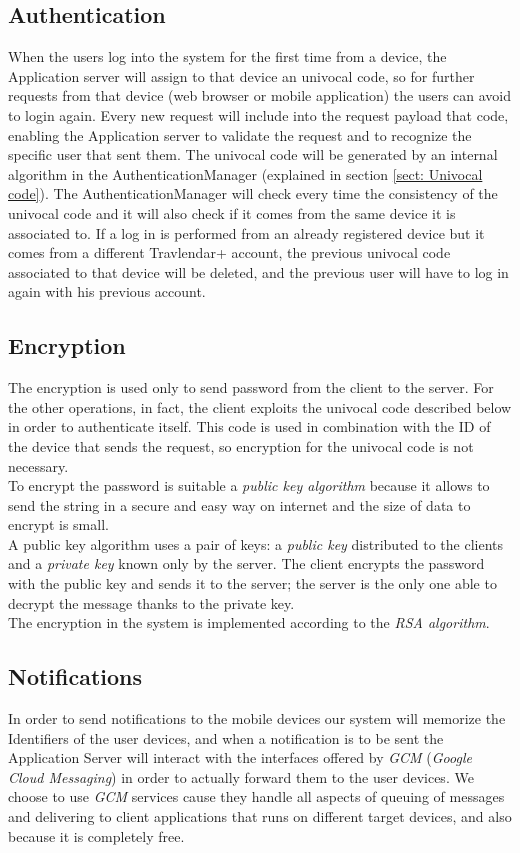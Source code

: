 \subsection{Authentication}
\label{subsect:Authentication}
When the users log into the system for the first time from a device, the Application server will assign to that device an univocal code, so for further requests from that device (web browser or mobile application) the users can avoid to login again. Every new request will include into the request payload that code, enabling the Application server to validate the request and to recognize the specific user that sent them. The univocal code will be generated by an internal algorithm in the AuthenticationManager (explained in section \ref{sect: Univocal code}). The AuthenticationManager will check every time the consistency of the univocal code and it will also check if it comes from the same device it is associated to.
If a log in is performed from an already registered device but it comes from a different Travlendar+ account, the previous univocal code associated to that device will be deleted, and the previous user will have to log in again with his previous account.

\subsection{Encryption}
\label{subsect:Encryption}
The encryption is used only to send password from the client to the server. For the other operations, in fact, the client exploits the univocal code described below in order to authenticate itself. This code is used in combination with the ID of the device that sends the request, so encryption for the univocal code is not necessary.\\
To encrypt the password is suitable a \textit{public key algorithm} because it allows to send the string in a secure and easy way on internet and the size of data to encrypt is small.\\
A public key algorithm uses a pair of keys: a \textit{public key} distributed to the clients and a \textit{private key} known only by the server. The client encrypts the password with the public key and sends it to the server; the server is the only one able to decrypt the message thanks to the private key.\\
The encryption in the system is implemented according to the \textit{RSA algorithm}.

\subsection{Notifications}
\label{subsect: Notifications}
In order to send notifications to the mobile devices our system will memorize the Identifiers of the user devices, and when a notification is to be sent the Application Server will interact with the interfaces offered by \textit{GCM} (\textit{Google Cloud Messaging}) in order to actually forward them to the user devices. We choose to use \textit{GCM} services cause they handle all aspects of queuing of messages and  delivering to client applications that runs on different target devices, and also because it is completely free.

